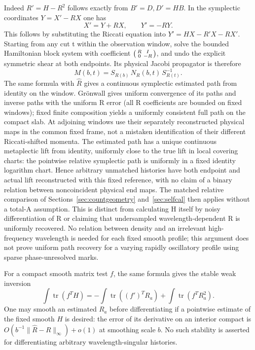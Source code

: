 \documentclass[11pt]{article}
\begin{document}
Indeed \(R'=H-R^2\) follows exactly from \(B'=D,D'=HB\). In the symplectic coordinates \(Y=X'-RX\) one has
\[
       X'=Y+RX,\qquad       Y'=-RY .
\]
This follows by substituting the Riccati equation into \(Y'=HX-R'X-RX'\). Starting from any cut t within the observation window, solve the bounded Hamiltonian block system with coefficient \(\begin{psmallmatrix}R&I\\0&-R\end{psmallmatrix}\), and undo the explicit symmetric shear at both endpoints. Its physical Jacobi propagator is therefore
\[
      M(b,t)=S_{R(b)}\,N_R(b,t)\,S_{R(t)}^{-1}.
\]
The same formula with \(\widehat R\) gives a continuous symplectic estimated path from identity on the window. Grönwall gives uniform convergence of its paths and inverse paths with the uniform R error (all R coefficients are bounded on fixed windows); fixed finite composition yields a uniformly consistent full path on the compact slab. At adjoining windows use their separately reconstructed physical maps in the common fixed frame, not a mistaken identification of their different Riccati-shifted momenta. The estimated path has a unique continuous metaplectic lift from identity, uniformly close to the true lift in local covering charts: the pointwise relative symplectic path is uniformly in a fixed identity logarithm chart. Hence arbitrary unmatched histories have both endpoint and actual lift reconstructed with this fixed reference, with no claim of a binary relation between noncoincident physical end maps. The matched relative comparison of Sections~\ref{sec:countgeometry} and~\ref{sec:selfcal} then applies without a total-A assumption. This is distinct from calculating H itself by noisy differentiation of R or claiming that undersampled wavelength-dependent R is uniformly recovered. No relation between density and an irrelevant high-frequency wavelength is needed for each fixed smooth profile; this argument does not prove uniform path recovery for a varying rapidly oscillatory profile using sparse phase-unresolved marks.

For a compact smooth matrix test \(f\), the same formula gives the
stable weak inversion
\[
 \int\operatorname{tr}(f^{T}H)
 =-\int\operatorname{tr}((f')^{T}R_a)
    +\int\operatorname{tr}(f^{T}R_a^2).
\]
One may smooth an estimated \(R_a\) before differentiating if a
pointwise estimate of the fixed smooth \(H\) is desired: the error of
its derivative on an interior compact is
\(O(b^{-1}\|\widehat R-R\|_\infty)+o(1)\) at smoothing scale \(b\).
No such stability is asserted for differentiating arbitrary
wavelength-singular histories.
\end{document}

